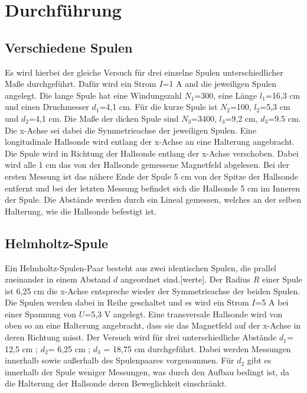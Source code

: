 \section{Durchführung}
\label{sec:Durchführung}

    \subsection{Verschiedene Spulen}

        Es wird hierbei der gleiche Versuch für drei einzelne Spulen 
        unterschiedlicher Maße durchgeführt. Dafür wird ein Strom $I$=1 \si{\ampere}
        and die jeweiligen Spulen angelegt. Die lange Spule hat eine 
        Windungszahl $N_1$=300, eine Länge $l_1$=16,3 \si{\centi\meter} und 
        einen Druchmesser $d_1$=4,1 \si{\centi\meter}. Für die kurze Spule ist 
        $N_2$=100, $l_2$=5,3 \si{\centi\meter} und $d_2$=4,1 \si{\centi\meter}.
        Die Maße der dicken Spule sind $N_3$=3400, $l_3$=9,2 \si{\centi\meter},
        $d_3$=9.5 \si{\centi\m}. Die x-Achse sei dabei die Symmetrieachse 
        der jeweiligen Spulen. Eine longitudinale Hallsonde wird entlang der x-Achse
        an eine Halterung angebracht. Die Spule wird in Richtung der Hallsonde
        entlang der x-Achse verschoben. Dabei wird alle 1 \si{\centi\meter} das von 
        der Hallsonde gemessene Magnetfeld abgelesen. Bei der ersten Messung ist das nähere 
        Ende der Spule 5 \si{\centi\meter} von der Spitze der Hallsonde entfernt und bei 
        der letzten Messung befindet sich die Hallsonde 5 \si{\centi\meter} im Inneren
        der Spule. Die Abstände werden durch ein Lineal gemessen, welches an der selben
        Halterung, wie die Hallsonde befestigt ist.

    \subsection{Helmholtz-Spule}
        
        Ein Helmholtz-Spulen-Paar besteht aus zwei identischen Spulen, die prallel zueinander
        in einem Abstand $d$ angeordnet sind.[werte]. Der Radius $R$ einer Spule ist 6,25 \si{\centi\meter}
        die x-Achse entspreche wieder der Symmetrieachse der beiden Spulen. Die Spulen werden dabei in
        Reihe geschaltet und es wird ein Strom $I$=5 \si{\ampere} bei einer Spannung von $U$=5,3 \si{\volt}
        angelegt. Eine transversale Hallsonde wird von oben so an eine Halterung angebracht, 
        dass sie das Magnetfeld auf 
        der x-Achse in deren Richtung misst. Der Versuch wird für drei unterschiedliche 
        Abstände $d_1$= 12,5 \si{\centi\meter} ; $d_2$= 6,25 \si{\centi\meter} ; 
        $d_3$ = 18,75 \si{\centi\meter} durchgeführt. Dabei werden Messungen innerhalb sowie außerhalb 
        des Spulenpaares vorgenommen. Für $d_2$ gibt es innerhalb der Spule weniger Messungen, was
        durch den Aufbau bedingt ist, da die Halterung der Hallsonde deren Beweglichkeit einschränkt.

